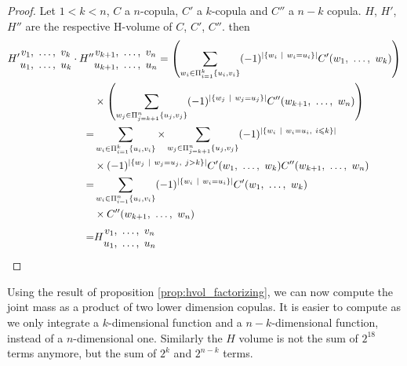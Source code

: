 \begin{proof}
    Let $1<k<n$, $C$ a $n$-copula, $C'$ a $k$-copula and $C''$ a $n-k$ copula. $H$, $H'$, $H''$ are the respective H-volume of $C$, $C'$, $C''$. then
    \begin{align*}
        {H'}
        \begin{matrix}
            v_1 , ~\dots, ~  v_k\\
            u_1 , ~\dots, ~  u_k
        \end{matrix}
        \cdot {H''}&
        \begin{matrix}
            v_{k+1} , ~\dots, ~  v_n\\
            u_{k+1} , ~\dots, ~  u_n
        \end{matrix}= \left(\sum_{w_i\in\Pi_{i=1}^{k}\{u_i,v_i\}}(-1)^{|\{w_i~|~w_i=u_i\}|}C'(w_1 , ~\dots, ~ w_k)\right)\\
        &\times\left(\sum_{w_j\in\Pi_{j=k+1}^{n}\{u_j,v_j\}}(-1)^{|\{w_j~|~w_j=u_j\}|}C''(w_{k+1} , ~\dots, ~ w_n)\right)\\
        =& \sum_{w_i\in\Pi_{i=1}^{k}\{u_i,v_i\}}\times\sum_{w_j\in\Pi_{j=k+1}^{n}\{u_j,v_j\}}(-1)^{|\{w_i~|~w_i=u_i,~i\leqslant k\}|}\\
        &\times(-1)^{|\{w_j~|~w_j=u_j,~ j>k\}|}C'(w_1 , ~\dots, ~ w_k)C''(w_{k+1} , ~\dots, ~ w_n)\\
        =&\sum_{w_i\in\Pi_{i=1}^{n}\{u_i,v_i\}}(-1)^{|\{w_i~|~w_i=u_i\}|}C'(w_1 , ~\dots, ~ w_k)\\
        &\times C''(w_{k+1} , ~\dots, ~ w_n)\\
        =&H
        \begin{matrix}
            v_1 , ~\dots, ~  v_n\\
            u_1 , ~\dots, ~  u_n
        \end{matrix}
    \end{align*}
\end{proof}
Using the result of proposition \ref{prop:hvol_factorizing}, we can now compute the joint mass as a product of two lower dimension copulas. It is easier to compute as we only integrate a $k$-dimensional function and a $n-k$-dimensional function, instead of a $n$-dimensional one. Similarly the $H$ volume is not the sum of $2^{18}$ terms anymore, but the sum of $2^{k}$ and $2^{n-k}$ terms.

